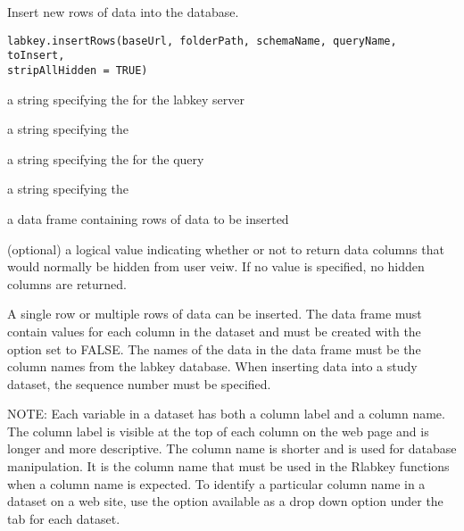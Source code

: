 \documentclass{book}
\begin{document}
\begin{Description}\relax
Insert new rows of data into the database.
\end{Description}
\begin{Usage}
\begin{verbatim}
labkey.insertRows(baseUrl, folderPath, schemaName, queryName, toInsert, 
stripAllHidden = TRUE)
\end{verbatim}
\end{Usage}
\begin{Arguments}
\begin{ldescription}
\item[\code{baseUrl}] a string specifying the for the labkey server
\item[\code{folderPath}] a string specifying the  
\item[\code{schemaName}] a string specifying the   for the query
\item[\code{queryName}] a string specifying the   
\item[\code{toInsert}] a data frame containing rows of data to be inserted
\item[\code{stripAllHidden}] (optional) a logical value indicating whether or not to return data columns that would 
normally be hidden from user veiw. If no value is specified, no hidden columns are returned.
\end{ldescription}
\end{Arguments}
\begin{Details}\relax
A single row or multiple rows of data can be inserted.  The  data frame must contain
values for each column in the dataset and must be created with the  option
set to FALSE. The names of the data in the data frame must be the column names from the
labkey database. When inserting data into a study dataset, the sequence number must be specified.

NOTE: Each variable in a dataset has both a column label and a column name. The column label is visible at the top
of each column on the web page and is longer and more descriptive. The column name is shorter and is
used  for database manipulation. It is the column name that must be used in
the Rlabkey functions when a column name is expected. To identify a particular column name in a dataset on
a web site, use the  option available as a drop down option under the 
tab for each dataset.
\end{Details}
\end{document}
